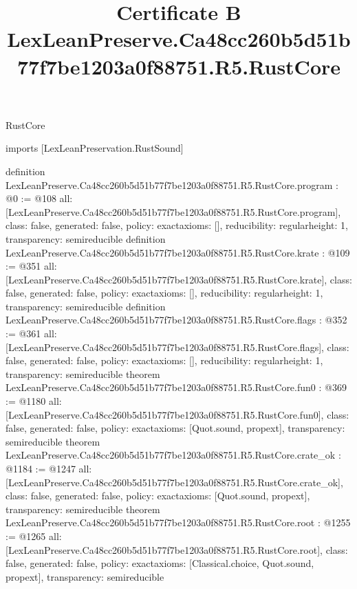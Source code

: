 \begin{lexlean}{RustCore}
\title{Certificate B LexLeanPreserve.Ca48cc260b5d51b77f7be1203a0f88751.R5.RustCore}
\begin{coremodule}
imports [LexLeanPreservation.RustSound]

definition LexLeanPreserve.Ca48cc260b5d51b77f7be1203a0f88751.R5.RustCore.program : @0 := @108 {
  all: [LexLeanPreserve.Ca48cc260b5d51b77f7be1203a0f88751.R5.RustCore.program],
  class: false,
  generated: false,
  policy: exact{axioms: []},
  reducibility: regular{height: 1},
  transparency: semireducible
}
definition LexLeanPreserve.Ca48cc260b5d51b77f7be1203a0f88751.R5.RustCore.krate : @109 := @351 {
  all: [LexLeanPreserve.Ca48cc260b5d51b77f7be1203a0f88751.R5.RustCore.krate],
  class: false,
  generated: false,
  policy: exact{axioms: []},
  reducibility: regular{height: 1},
  transparency: semireducible
}
definition LexLeanPreserve.Ca48cc260b5d51b77f7be1203a0f88751.R5.RustCore.flags : @352 := @361 {
  all: [LexLeanPreserve.Ca48cc260b5d51b77f7be1203a0f88751.R5.RustCore.flags],
  class: false,
  generated: false,
  policy: exact{axioms: []},
  reducibility: regular{height: 1},
  transparency: semireducible
}
theorem LexLeanPreserve.Ca48cc260b5d51b77f7be1203a0f88751.R5.RustCore.fun0 : @369 := @1180 {
  all: [LexLeanPreserve.Ca48cc260b5d51b77f7be1203a0f88751.R5.RustCore.fun0],
  class: false,
  generated: false,
  policy: exact{axioms: [Quot.sound, propext]},
  transparency: semireducible
}
theorem LexLeanPreserve.Ca48cc260b5d51b77f7be1203a0f88751.R5.RustCore.crate_ok : @1184 := @1247 {
  all: [LexLeanPreserve.Ca48cc260b5d51b77f7be1203a0f88751.R5.RustCore.crate_ok],
  class: false,
  generated: false,
  policy: exact{axioms: [Quot.sound, propext]},
  transparency: semireducible
}
theorem LexLeanPreserve.Ca48cc260b5d51b77f7be1203a0f88751.R5.RustCore.root : @1255 := @1265 {
  all: [LexLeanPreserve.Ca48cc260b5d51b77f7be1203a0f88751.R5.RustCore.root],
  class: false,
  generated: false,
  policy: exact{axioms: [Classical.choice, Quot.sound, propext]},
  transparency: semireducible
}


\end{coremodule}
\end{lexlean}

